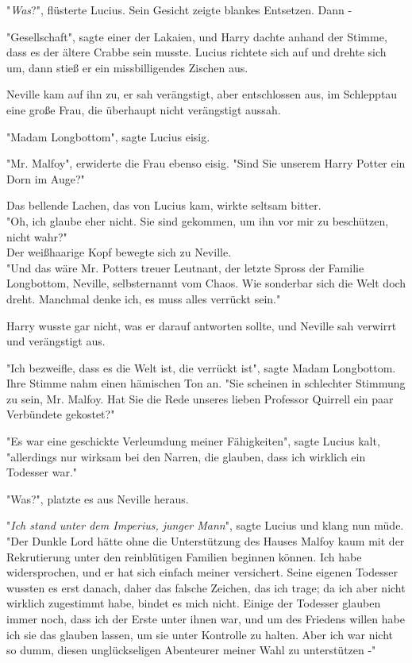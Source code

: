 {"\emph{Was}?", flüsterte Lucius. Sein Gesicht zeigte blankes Entsetzen. Dann -

"Gesellschaft", sagte einer der Lakaien, und Harry dachte anhand der Stimme, dass es der ältere Crabbe sein musste. Lucius richtete sich auf und drehte sich um, dann stieß er ein missbilligendes Zischen aus.

Neville kam auf ihn zu, er sah verängstigt, aber entschlossen aus, im Schlepptau eine große Frau, die überhaupt nicht verängstigt aussah.

"Madam Longbottom", sagte Lucius eisig.

"Mr. Malfoy", erwiderte die Frau ebenso eisig. "Sind Sie unserem Harry Potter ein Dorn im Auge?"

Das bellende Lachen, das von Lucius kam, wirkte seltsam bitter.\\ "Oh, ich glaube eher nicht. Sie sind gekommen, um ihn vor mir zu beschützen, nicht wahr?"\\ Der weißhaarige Kopf bewegte sich zu Neville.\\ "Und das wäre Mr. Potters treuer Leutnant, der letzte Spross der Familie Longbottom, Neville, selbsternannt vom Chaos. Wie sonderbar sich die Welt doch dreht. Manchmal denke ich, es muss alles verrückt sein."

Harry wusste gar nicht, was er darauf antworten sollte, und Neville sah verwirrt und verängstigt aus.

"Ich bezweifle, dass es die Welt ist, die verrückt ist", sagte Madam Longbottom. Ihre Stimme nahm einen hämischen Ton an. "Sie scheinen in schlechter Stimmung zu sein, Mr. Malfoy. Hat Sie die Rede unseres lieben Professor Quirrell ein paar Verbündete gekostet?"

"Es war eine geschickte Verleumdung meiner Fähigkeiten", sagte Lucius kalt,\\ "allerdings nur wirksam bei den Narren, die glauben, dass ich wirklich ein Todesser war."

"Was?", platzte es aus Neville heraus.

"\emph{Ich stand unter dem Imperius, junger Mann}", sagte Lucius und klang nun müde.\\ "Der Dunkle Lord hätte ohne die Unterstützung des Hauses Malfoy kaum mit der Rekrutierung unter den reinblütigen Familien beginnen können. Ich habe widersprochen, und er hat sich einfach meiner versichert. Seine eigenen Todesser wussten es erst danach, daher das falsche Zeichen, das ich trage; da ich aber nicht wirklich zugestimmt habe, bindet es mich nicht. Einige der Todesser glauben immer noch, dass ich der Erste unter ihnen war, und um des Friedens willen habe ich sie das glauben lassen, um sie unter Kontrolle zu halten. Aber ich war nicht so dumm, diesen unglückseligen Abenteurer meiner Wahl zu unterstützen -"

}
